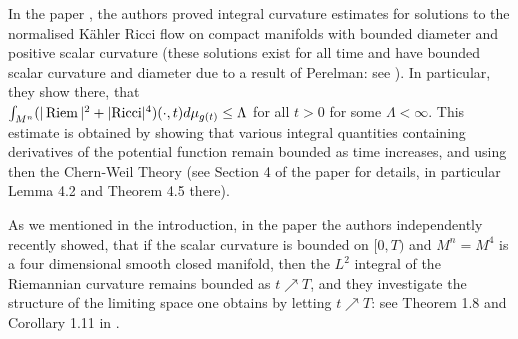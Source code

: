 \documentclass{amsart}
\numberwithin{equation}{section}
\theoremstyle{definition}
\theoremstyle{remark}
\begin{document}
In the paper \cite{TZ}, the authors proved 
integral curvature estimates for
solutions to the normalised K\"ahler Ricci flow on compact manifolds with bounded
diameter and positive scalar curvature (these solutions exist for all
time and have bounded scalar curvature and diameter due to a result of
Perelman: see \cite{ST}). In particular, they show
there, that \\
$\int_{M^n} (|\operatorname{Riem}|^2 + |{{\rm{Ricci}}}|^4)(\cdot,t) d\mu_{g(t)} \leq \Lambda $ for all $t>0$ for some
$\Lambda< \infty$. This estimate is obtained by  showing that
various integral quantities containing derivatives of  the potential function
remain bounded as time increases, and using then the Chern-Weil Theory (see
Section 4 of the paper \cite{TZ} for details, in particular Lemma 4.2 and
Theorem 4.5 there).

As we mentioned in the introduction, in the paper \cite{BZ} the
authors  independently
recently showed, that if the scalar curvature is bounded on $[0,T)$
and $M^n
= M^4$ is a four dimensional smooth closed manifold, then the $L^2$
integral of the Riemannian curvature remains bounded as $t {\nearrow} T$, 
and  they investigate the structure
of the limiting space one obtains by letting  $t {\nearrow}
T$: see Theorem 1.8 and Corollary 1.11 in \cite{BZ}.
\end{document}
